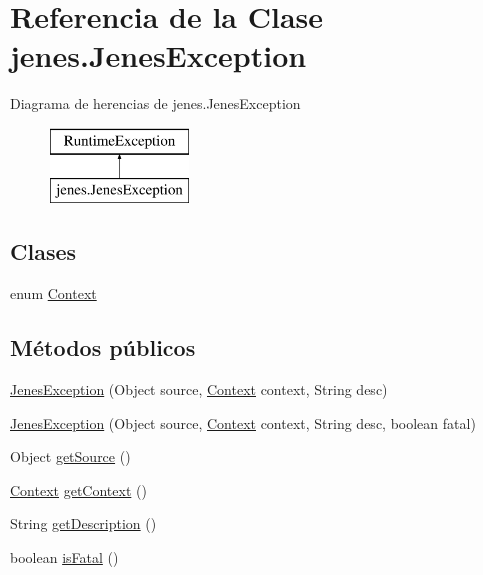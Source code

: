\hypertarget{classjenes_1_1_jenes_exception}{\section{Referencia de la Clase jenes.\-Jenes\-Exception}
\label{classjenes_1_1_jenes_exception}
}
Diagrama de herencias de jenes.\-Jenes\-Exception\begin{figure}[H]
\begin{center}
\leavevmode
\includegraphics[height=2.000000cm]{classjenes_1_1_jenes_exception}
\end{center}
\end{figure}
\subsection*{Clases}
\begin{DoxyCompactItemize}
\item 
enum \hyperlink{enumjenes_1_1_jenes_exception_1_1_context}{Context}
\end{DoxyCompactItemize}
\subsection*{Métodos públicos}
\begin{DoxyCompactItemize}
\item 
\hyperlink{classjenes_1_1_jenes_exception_a0896ada42c15de11ae090d00f60712e6}{Jenes\-Exception} (Object source, \hyperlink{enumjenes_1_1_jenes_exception_1_1_context}{Context} context, String desc)
\item 
\hyperlink{classjenes_1_1_jenes_exception_ab12d2e209aa3cfe14f08b4732271d9d9}{Jenes\-Exception} (Object source, \hyperlink{enumjenes_1_1_jenes_exception_1_1_context}{Context} context, String desc, boolean fatal)
\item 
Object \hyperlink{classjenes_1_1_jenes_exception_a1dc5c4b0404aeab984604002fad7dbfb}{get\-Source} ()
\item 
\hyperlink{enumjenes_1_1_jenes_exception_1_1_context}{Context} \hyperlink{classjenes_1_1_jenes_exception_a9a47a0e830dda47c1f9841461fb29726}{get\-Context} ()
\item 
String \hyperlink{classjenes_1_1_jenes_exception_a0d37f5de0bddb6c1a3014816f217281c}{get\-Description} ()
\item 
boolean \hyperlink{classjenes_1_1_jenes_exception_a4d673283c5e13dd3b95e73cf780e9419}{is\-Fatal} ()
\end{DoxyCompactItemize}


